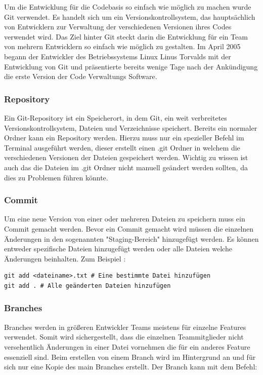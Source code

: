 Um die Entwicklung für die Codebasis so einfach wie möglich zu machen wurde Git verwendet. Es handelt sich um ein Versionskontrollsystem, das hauptsächlich von Entwicklern zur Verwaltung der verschiedenen Versionen ihres Codes verwendet wird. Das Ziel hinter Git steckt darin die Entwicklung für ein Team von mehrern Entwicklern so einfach wie möglich zu gestalten. Im April 2005 begann der Entwickler des Betriebssystems Linux Linus Torvalds mit der Entwicklung von Git und präsentierte bereits wenige Tage nach der Ankündigung die erste Version der Code Verwaltungs Software.

\cite{Git}

\subsubsection{Repository}

Ein Git-Repository ist ein Speicherort, in dem Git, ein weit verbreitetes Versionskontrollsystem, Dateien und Verzeichnisse speichert. Bereits ein normaler Ordner kann ein Repository werden. Hierzu muss nur ein spezieller Befehl im Terminal ausgeführt werden, dieser erstellt einen .git Ordner in welchem die verschiedenen Versionen der Dateien gespeichert werden. Wichtig zu wissen ist auch das die Dateien im .git Ordner nicht manuell geändert werden sollten, da dies zu Problemen führen könnte.

\subsubsection{Commit}

Um eine neue Version von einer oder mehreren Dateien zu speichern muss ein Commit gemacht werden. Bevor ein Commit gemacht wird müssen die einzelnen Änderungen in den sogenannten "Staging-Bereich" hinzugefügt werden. Es können entweder spezifische Dateien hinzugefügt werden oder alle Dateien welche Änderungen beinhalten. Zum Beispiel :

\begin{verbatim}
git add <dateiname>.txt # Eine bestimmte Datei hinzufügen
git add . # Alle geänderten Dateien hinzufügen
\end{verbatim}

\subsubsection{Branches}

Branches werden in größeren Entwickler Teams meistens für einzelne Features verwendet. Somit wird sichergestellt, dass die einzelnen Teammitglieder nicht versehentlich Änderungen in einer Datei vornehmen die für ein anderes Feature essenziell sind. Beim erstellen von einem Branch wird im Hintergrund an und für sich nur eine Kopie des main Branches erstellt. Der Branch kann mit dem Befehl: 

